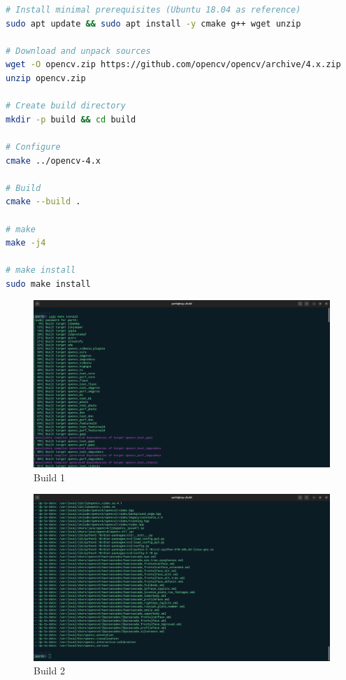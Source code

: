 \documentclass[a4paper,11pt]{article}%
\newenvironment{qanda}{\setlength{\parindent}{0pt}}{\bigskip}
\begin{document}
\begin{qanda}
\begin{enumerate}
			\begin{lstlisting}[language=sh]
# Install minimal prerequisites (Ubuntu 18.04 as reference)
sudo apt update && sudo apt install -y cmake g++ wget unzip

# Download and unpack sources
wget -O opencv.zip https://github.com/opencv/opencv/archive/4.x.zip
unzip opencv.zip

# Create build directory
mkdir -p build && cd build

# Configure
cmake ../opencv-4.x

# Build
cmake --build .

# make 
make -j4

# make install
sudo make install
		\end{lstlisting}

			\begin{figure}[H]
				\centering
				\includegraphics[scale=0.25]{figures/build1.png}
				\caption{Build 1}
			\end{figure}
			\begin{figure}[H]
				\centering
				\includegraphics[scale=0.25]{figures/build2.png}
				\caption{Build 2}

\end{figure}
\end{enumerate}
\end{qanda}
\end{document}
